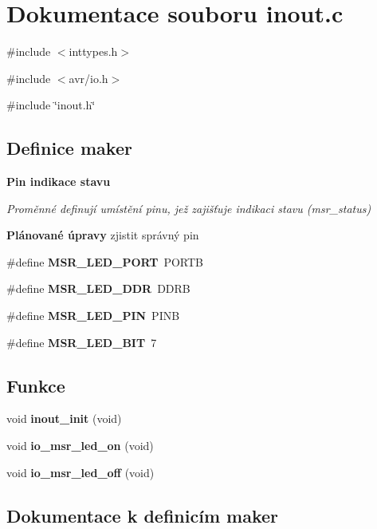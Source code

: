 \section{Dokumentace souboru inout.c}
\label{inout_8c}
{\ttfamily \#include $<$inttypes.h$>$}\par
{\ttfamily \#include $<$avr/io.h$>$}\par
{\ttfamily \#include \char`\"{}inout.h\char`\"{}}\par
\subsection*{Definice maker}
\begin{Indent}{\bf Pin indikace stavu}\par
{\em \label{_amgrp462d75767ffb475eccd6940509b18b92}
 Proměnné definují umístění pinu, jež zajišťuje indikaci stavu (msr\_\-status) \begin{Desc}
\item[{\bf Plánované úpravy}]zjistit správný pin\end{Desc}
}\begin{DoxyCompactItemize}
\item 
\#define {\bf MSR\_\-LED\_\-PORT}~PORTB
\item 
\#define {\bf MSR\_\-LED\_\-DDR}~DDRB
\item 
\#define {\bf MSR\_\-LED\_\-PIN}~PINB
\item 
\#define {\bf MSR\_\-LED\_\-BIT}~7
\end{DoxyCompactItemize}
\end{Indent}
\subsection*{Funkce}
\begin{DoxyCompactItemize}
\item 
void {\bf inout\_\-init} (void)
\item 
void {\bf io\_\-msr\_\-led\_\-on} (void)
\item 
void {\bf io\_\-msr\_\-led\_\-off} (void)
\end{DoxyCompactItemize}


\subsection{Dokumentace k definicím maker}
